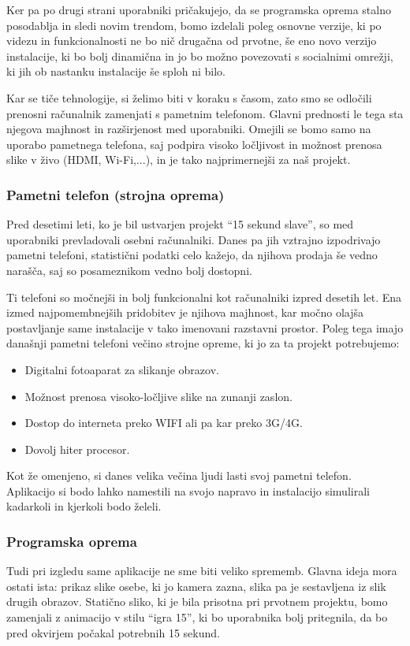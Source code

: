 Ker pa po drugi strani uporabniki pričakujejo, da se programska oprema stalno posodablja in sledi novim trendom, bomo izdelali poleg osnovne verzije, ki po videzu in funkcionalnosti ne bo nič drugačna od prvotne, še eno novo verzijo instalacije, ki bo bolj dinamična in jo bo možno povezovati s socialnimi omrežji, ki jih ob nastanku instalacije še sploh ni bilo.

Kar se tiče tehnologije, si želimo biti v koraku s časom, zato smo se odločili prenosni računalnik zamenjati s pametnim telefonom. Glavni prednosti le tega sta njegova majhnost in razširjenost med uporabniki. Omejili se bomo samo na uporabo pametnega telefona, saj podpira visoko ločljivost in možnost prenosa slike v živo (HDMI, Wi-Fi,...), in je tako najprimernejši za naš projekt.


\subsubsection{Pametni telefon (strojna oprema)}
Pred desetimi leti, ko je bil ustvarjen projekt ``15 sekund slave'', so med uporabniki prevladovali osebni računalniki. Danes pa jih vztrajno izpodrivajo pametni telefoni, statistični podatki celo kažejo, da njihova prodaja še vedno narašča, saj so posameznikom vedno bolj dostopni.

Ti telefoni so močnejši in bolj funkcionalni kot računalniki izpred desetih let. Ena izmed najpomembnejših pridobitev je njihova majhnost, kar močno olajša postavljanje same instalacije v tako imenovani razstavni prostor. Poleg tega imajo današnji pametni telefoni večino strojne opreme, ki jo za ta projekt potrebujemo:
\begin{itemize}
\item Digitalni fotoaparat za slikanje obrazov.
\item Možnost prenosa visoko-ločljive slike na zunanji zaslon.
\item Dostop do interneta preko WIFI ali pa kar preko 3G/4G.
\item Dovolj hiter procesor.
\end{itemize}

Kot že omenjeno, si danes velika večina ljudi lasti svoj pametni telefon. Aplikacijo si bodo lahko namestili na svojo napravo in instalacijo simulirali kadarkoli in kjerkoli bodo želeli.


\subsubsection{Programska oprema}
Tudi pri izgledu same aplikacije ne sme biti veliko sprememb. Glavna ideja mora ostati ista: prikaz slike osebe, ki jo kamera zazna, slika pa je sestavljena iz slik drugih obrazov. Statično sliko, ki je bila prisotna pri prvotnem projektu, bomo zamenjali z animacijo v stilu ``igra 15'', ki bo uporabnika bolj pritegnila, da bo pred okvirjem počakal potrebnih 15 sekund.

